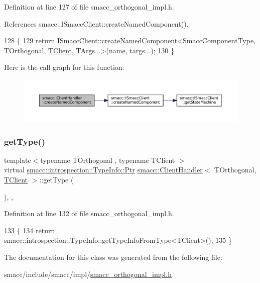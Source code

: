 Definition at line 127 of file smacc\+\_\+orthogonal\+\_\+impl.\+h.



References smacc\+::\+I\+Smacc\+Client\+::create\+Named\+Component().


\begin{DoxyCode}
128     \{
129         \textcolor{keywordflow}{return} \hyperlink{classsmacc_1_1ISmaccClient_affcc2f95bc993b5f07ef0d6ab6eec8f1}{ISmaccClient::createNamedComponent}<SmaccComponentType, 
      TOrthogonal, \hyperlink{classTClient}{TClient}, TArgs...>(name, targs...);
130     \}
\end{DoxyCode}
Here is the call graph for this function\+:
\nopagebreak
\begin{figure}[H]
\begin{center}
\leavevmode
\includegraphics[width=350pt]{classsmacc_1_1ClientHandler_a33f440a8e06038df0dd291d2ea278f39_cgraph}
\end{center}
\end{figure}
\mbox{\label{classsmacc_1_1ClientHandler_a018a50262de782c479414cf18daddac9}} 
\subsubsection{\texorpdfstring{get\+Type()}{getType()}}
{\footnotesize\ttfamily template$<$typename T\+Orthogonal , typename T\+Client $>$ \\
virtual \hyperlink{classsmacc_1_1introspection_1_1TypeInfo_aa6ffd9c39811d59f7c771941b7fad860}{smacc\+::introspection\+::\+Type\+Info\+::\+Ptr} \hyperlink{classsmacc_1_1ClientHandler}{smacc\+::\+Client\+Handler}$<$ T\+Orthogonal, \hyperlink{classTClient}{T\+Client} $>$\+::get\+Type (\begin{DoxyParamCaption}{ }\end{DoxyParamCaption})\hspace{0.3cm}{\ttfamily [inline]}, {\ttfamily [override]}, {\ttfamily [virtual]}}



Definition at line 132 of file smacc\+\_\+orthogonal\+\_\+impl.\+h.


\begin{DoxyCode}
133     \{
134         \textcolor{keywordflow}{return} smacc::introspection::TypeInfo::getTypeInfoFromType<TClient>();
135     \}
\end{DoxyCode}


The documentation for this class was generated from the following file\+:\begin{DoxyCompactItemize}
\item 
smacc/include/smacc/impl/\hyperlink{smacc__orthogonal__impl_8h}{smacc\+\_\+orthogonal\+\_\+impl.\+h}\end{DoxyCompactItemize}
